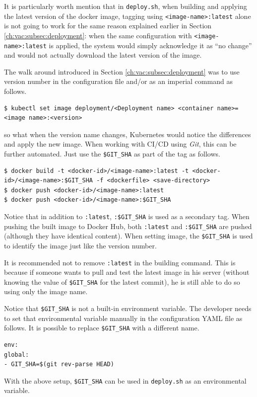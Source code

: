 It is particularly worth mention that in \verb|deploy.sh|, when building and applying the latest version of the docker image, tagging using \verb|<image-name>:latest| alone is not going to work for the same reason explained earlier in Section \ref{ch:vac:subsec:deployment}: when the same configuration with \verb|<image-name>:latest| is applied, the system would simply acknowledge it as ``no change'' and would not actually download the latest version of the image.

The walk around introduced in Section \ref{ch:vac:subsec:deployment} was to use version number in the configuration file and/or as an imperial command as follows.
\begin{lstlisting}
$ kubectl set image deployment/<Deployment name> <container name>=<image name>:<version>
\end{lstlisting}
so what when the version name changes, Kubernetes would notice the differences and apply the new image. When working with CI/CD using \textit{Git}, this can be further automated. Just use the \verb|$GIT_SHA| as part of the tag as follows.
\begin{lstlisting}
$ docker build -t <docker-id>/<image-name>:latest -t <docker-id>/<image-name>:$GIT_SHA -f <dockerfile> <save-directory>
$ docker push <docker-id>/<image-name>:latest
$ docker push <docker-id>/<image-name>:$GIT_SHA
\end{lstlisting}
Notice that in addition to \verb|:latest|, \verb|:$GIT_SHA| is used as a secondary tag. When pushing the built image to Docker Hub, both \verb|:latest| and \verb|:$GIT_SHA| are pushed (although they have identical content). When setting image, the \verb|$GIT_SHA| is used to identify the image just like the version number.

It is recommended not to remove \verb|:latest| in the building command. This is because if someone wants to pull and test the latest image in his server (without knowing the value of \verb|$GIT_SHA| for the latest commit), he is still able to do so using only the image name.

Notice that \verb|$GIT_SHA| is not a built-in environment variable. The developer needs to set that environmental variable manually in the configuration YAML file as follows. It is possible to replace \verb|$GIT_SHA| with a different name.
\begin{lstlisting}
env:
global:
- GIT_SHA=$(git rev-parse HEAD)
\end{lstlisting}
With the above setup, \verb|$GIT_SHA| can be used in \verb|deploy.sh| as an environmental variable.

